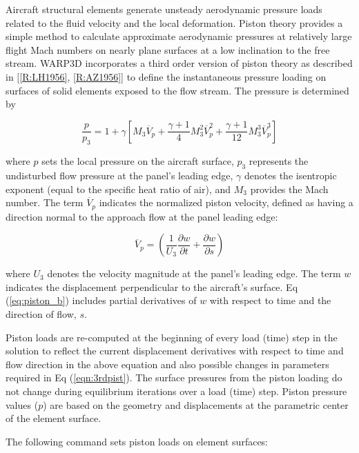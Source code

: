 \documentclass[11pt]{report}
\numberwithin{equation}{section}
\newcommand{\noi}{\noindent}
\begin{document}
\noi Aircraft structural elements generate unsteady aerodynamic pressure loads 
related to the fluid velocity and the local deformation. Piston theory provides
a simple method to calculate approximate aerodynamic pressures at relatively large
flight Mach numbers on nearly plane surfaces at a low inclination to the free stream. 
WARP3D incorporates a third order version of piston theory as described 
in [\ref{R:LH1956}, \ref{R:AZ1956}] to define the instantaneous pressure loading 
on surfaces of solid elements exposed
to the flow stream. The pressure is determined by


\begin{equation} \label{eq:piston_a}
\frac{p}{p_3} = 1 + \gamma \left [ M_3 \overline V_p + \frac{\gamma +1}{4}
M_3^2 \overline V_p^2 + \frac{\gamma +1}{12} M_3^3 \overline V_p^3
\right ]
 \end{equation}

\noindent where $p$ sets the local pressure on the aircraft surface, 
$p_3$ represents the undisturbed flow pressure at the panel's leading edge, $\gamma$ denotes 
the isentropic exponent (equal to the specific heat ratio of air), 
and $M_3$ provides the Mach number. The term $\overline{V}_p$ indicates
the normalized piston velocity, defined as having a 
direction normal to the approach flow at the panel leading edge:

\begin{equation} \label{eq:piston_b}
\overline V_p = \left ( \frac{1}{U_3}  \frac{\partial w}{\partial t} + \frac{\partial w}{\partial s} \right ) 
 \end{equation}

\noindent where $U_3$ denotes the velocity magnitude at the panel's leading edge. 
The term $w$ indicates the displacement perpendicular  to the aircraft's 
surface. Eq (\ref{eq:piston_b}) includes partial derivatives of $w$ 
with respect to time and the direction of flow, $s$. 

Piston loads are re-computed at the beginning of every load (time) step
in the solution to reflect the current displacement derivatives with respect to
time and flow direction in the
above equation and also possible changes in parameters required in
Eq (\ref{eqn:3rdpist}). The surface pressures from the piston loading 
do not change during equilibrium iterations over a load (time) step. 
Piston pressure values ($p$) are based on the geometry
and displacements at the parametric center of the element surface. 

The following command sets piston loads on element surfaces: 
\end{document}
